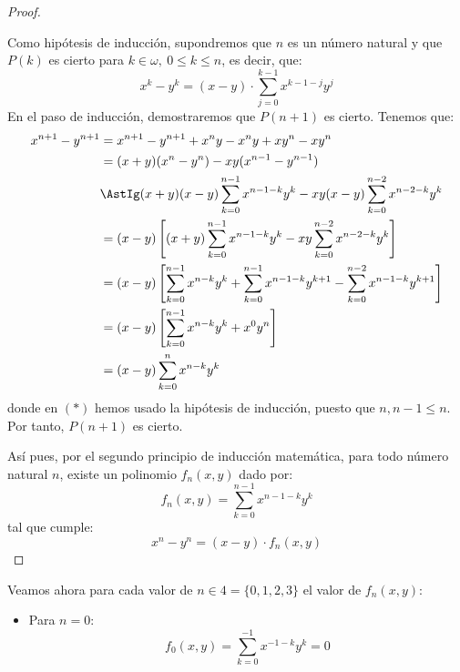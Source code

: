 \documentclass[12pt]{article}
\begin{document}
\begin{ejercicio}[Inducción]
\begin{proof}
\begin{itemize}
                Como hipótesis de inducción, supondremos que $n$ es un número natural y que $P(k)$ es cierto para $k\in \omega,~0\leq k\leq n$, es decir, que:
                \begin{equation*}
                    x^k - y^k = (x-y)\cdot \sum_{j=0}^{k-1}x^{k-1-j}y^j
                \end{equation*}
                En el paso de inducción, demostraremos que $P(n+1)$ es cierto. Tenemos que:
                \begin{align*}
                    x^{n+1} - y^{n+1} &= x^{n+1} - y^{n+1} + x^ny -x^ny +xy^n -xy^n \\
                    &= (x+y)(x^n - y^n) -xy(x^{n-1} - y^{n-1}) \\
                    &\AstIg (x+y)(x-y)\sum_{k=0}^{n-1}x^{n-1-k}y^k -xy(x-y)\sum_{k=0}^{n-2}x^{n-2-k}y^k \\
                    &= (x-y)\left[(x+y)\sum_{k=0}^{n-1}x^{n-1-k}y^k - xy\sum_{k=0}^{n-2}x^{n-2-k}y^k\right] \\
                    &= (x-y)\left[\sum_{k=0}^{n-1}x^{n-k}y^k + \sum_{k=0}^{n-1}x^{n-1-k}y^{k+1} - \sum_{k=0}^{n-2}x^{n-1-k}y^{k+1}\right] \\
                    &= (x-y)\left[\sum_{k=0}^{n-1}x^{n-k}y^k + x^0y^n\right] \\
                    &= (x-y)\sum_{k=0}^{n}x^{n-k}y^k
                \end{align*}
                donde en $(\ast)$ hemos usado la hipótesis de inducción, puesto que $n,n-1\leq n$. Por tanto, $P(n+1)$ es cierto.
            \end{itemize}
    
            Así pues, por el segundo principio de inducción matemática, para todo número natural $n$, existe un polinomio $f_n(x, y)$ dado por:
            \begin{equation*}
                f_n(x, y) = \sum_{k=0}^{n-1}x^{n-1-k}y^k
            \end{equation*}
            tal que cumple:
            \begin{equation*}
                x^n - y^n = (x-y)\cdot f_n(x, y)
            \end{equation*}
        \end{proof}

        Veamos ahora para cada valor de $n\in 4= \{0, 1, 2, 3\}$ el valor de $f_n(x, y)$:
            \begin{itemize}
                \item Para $n=0$:
                    \begin{equation*}
                        f_0(x, y) = \sum_{k=0}^{-1}x^{-1-k}y^k = 0
                    \end{equation*}


\end{itemize}
\end{ejercicio}
\end{document}
